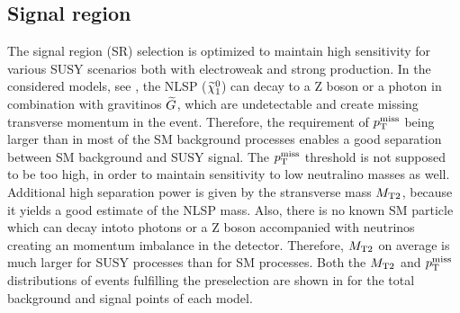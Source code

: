 \subsection{Signal region}\label{sec:SRSelection}
The signal region (SR) selection is optimized to maintain high sensitivity for various SUSY scenarios both with electroweak and strong production. In the considered models, see , the NLSP ($\widetilde{\chi}^{0}_{1}$) can decay to a Z boson or a photon in combination with gravitinos $\widetilde{G}$, which are undetectable and create missing transverse momentum in the event. Therefore, the requirement of $p_{\mathrm{T}}^\text{miss}$ being larger than in most of the SM background processes enables a good separation between SM background and SUSY signal. The $p_{\mathrm{T}}^\text{miss}$ threshold is not supposed to be too high, in order to maintain sensitivity to low neutralino masses as well.
Additional high separation power is given by the stransverse mass $M_{\mathrm{T2}}$, because it yields a good estimate of the NLSP mass. Also, there is no known SM particle which can decay intoto photons or a Z boson accompanied with neutrinos creating an momentum imbalance in the detector. Therefore, $M_{\mathrm{T2}}$ on average is much larger for SUSY processes than for SM processes. Both the $M_{\mathrm{T2}}$ and $p_{\mathrm{T}}^\text{miss}$ distributions of events fulfilling the preselection are shown in  for the total background and signal points of each model.
